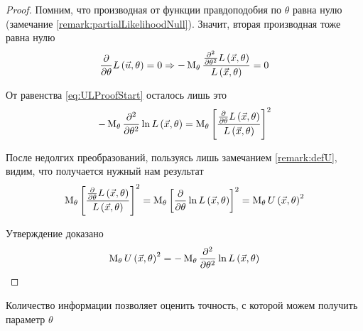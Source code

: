 \begin{proof}
  Помним, что производная от функции правдоподобия по $\theta$ равна нулю
  (замечание \ref{remark:partialLikelihoodNull}).
  Значит, вторая производная тоже равна нулю
  $$\frac{\partial}{\partial\theta}L\left( \vec{u},\theta \right) = 0
    \Rightarrow
      -\operatorname{M}_{\theta} 
      \frac{\frac{\partial^2}{\partial\theta^2}
        L\left(\vec{x},\theta\right)}
        {L\left(\vec{x},\theta\right)} = 0$$


  От равенства \eqref{eq:ULProofStart} осталось лишь это
  $$- \operatorname{M}_{\theta} \frac{\partial^2}{\partial\theta^2}
      \ln{L\left( \vec{x},\theta \right)}
    = \operatorname{M}_{\theta} \left[\frac{\frac{\partial}{\partial\theta}
        L\left(\vec{x},\theta\right)}
        {L\left(\vec{x},\theta\right)}\right]^2$$

  После недолгих преобразований, пользуясь лишь замечанием \ref{remark:defU},
  видим, что получается нужный нам результат
  \begin{align*}
    \operatorname{M}_{\theta} 
      \left[\frac{\frac{\partial}{\partial\theta}
        L\left(\vec{x},\theta\right)}
        {L\left(\vec{x},\theta\right)}\right]^2
    =\operatorname{M}_{\theta} \left[
      \frac{\partial}{\partial\theta}
      \ln{L\left( \vec{x},\theta \right)}\right]^2
    =\operatorname{M}_{\theta} U\left( \vec{x},\theta \right)^2
  \end{align*}

  Утверждение доказано
  $$\operatorname{M}_{\theta} U\left( \vec{x},\theta \right)^2
    =-\operatorname{M}_{\theta} 
      \frac{\partial^2}{\partial\theta^2}
      \ln{L\left( \vec{x},\theta \right)}$$
\end{proof}

Количество информации позволяет оценить точность,
с которой можем получить параметр $\theta$

